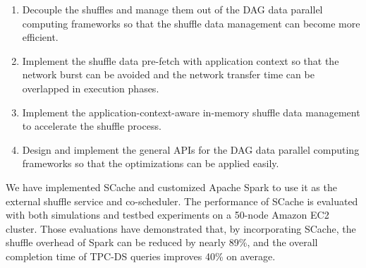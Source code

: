 \begin{englishabstract}
\begin{enumerate}
    \item Decouple the shuffles and manage them out of the DAG data parallel computing frameworks so that the shuffle data management can become more efficient.
    \item Implement the shuffle data pre-fetch with application context so that the network burst can be avoided and the network transfer time can be overlapped in execution phases.
    \item Implement the application-context-aware in-memory shuffle data management to accelerate the shuffle process.
    \item Design and implement the general APIs for the DAG data parallel computing frameworks so that the optimizations can be applied easily.
\end{enumerate}

We have implemented SCache and customized Apache Spark\cite{apachespark} to use it as the external shuffle service and co-scheduler. 
The performance of SCache is evaluated with both simulations and testbed experiments on a 50-node Amazon EC2 cluster.
Those evaluations have demonstrated that, by incorporating SCache, the shuffle overhead of Spark can be reduced by nearly 89\%, 
and the overall completion time of TPC-DS queries improves 40\% on average.


\end{englishabstract}

